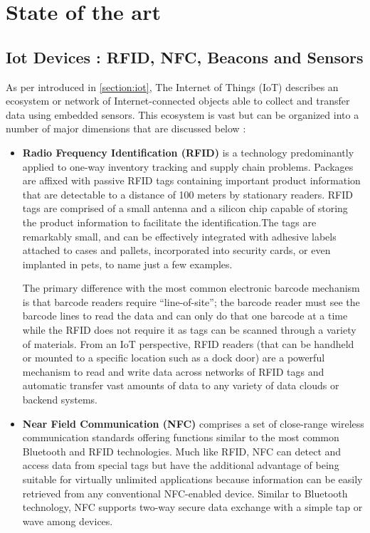 \chead{}
\chapter{State of the art}

\section{Iot Devices : RFID, NFC, Beacons and Sensors}

As per introduced in \ref{section:iot}, The Internet of Things (IoT) describes an ecosystem or network of Internet-connected objects able to collect and transfer data using embedded sensors. This ecosystem is vast but can be organized into a number of major dimensions that are discussed below : 

\begin{itemize}
  \item \textbf{Radio Frequency Identification (RFID) } is a technology predominantly applied to one-way inventory tracking and supply chain problems. Packages are affixed with passive RFID tags containing important product information that are detectable to a distance of 100 meters by stationary readers. RFID tags are comprised of a small antenna and a silicon chip capable of storing the product information to facilitate the identification.The tags are remarkably small, and can be effectively integrated with adhesive labels attached to cases and pallets, incorporated into security cards, or even implanted in pets, to name just a few examples.
  
  The primary difference with the most common electronic barcode mechanism is that barcode readers require “line-of-site”; the barcode reader must see the barcode lines to read the data and can only do that one barcode at a time while the RFID does not require it as tags can be scanned through a variety of materials. From an IoT perspective, RFID readers (that can be handheld or mounted to a specific location such as a dock door) are a powerful mechanism to read and write data across networks of RFID tags and automatic transfer vast amounts of data to any variety of data clouds or backend systems.

  \item \textbf{Near Field Communication (NFC) } comprises a set of close-range wireless communication standards offering functions similar to the most common Bluetooth and RFID technologies. Much like RFID, NFC can detect and access data from special tags but have the additional advantage of being suitable for virtually unlimited applications because information can be easily retrieved from any conventional NFC-enabled device. Similar to Bluetooth technology, NFC supports two-way secure data exchange with a simple tap or wave among devices.
  

\end{itemize}

